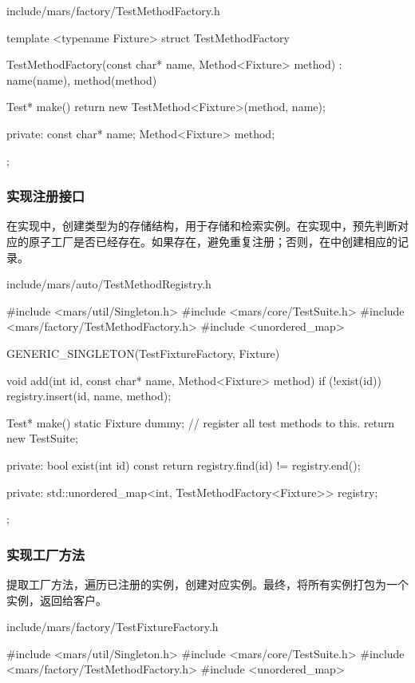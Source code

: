\begin{content}
\begin{nodiff}{include/mars/factory/TestMethodFactory.h}
\begin{c++}
template <typename Fixture>
struct TestMethodFactory {
  TestMethodFactory(const char* name, Method<Fixture> method)
    : name(name), method(method) {}

  Test* make() {
    return new TestMethod<Fixture>(method, name);
  }

private:
  const char* name;
  Method<Fixture> method;
};
 \end{c++}
\end{nodiff}

\subsubsection{实现注册接口}

在实现中，创建类型为的存储结构，用于存储和检索实例。在实现中，预先判断对应的原子工厂是否已经存在。如果存在，避免重复注册；否则，在中创建相应的记录。

\begin{nodiff}{include/mars/auto/TestMethodRegistry.h}
 \begin{c++}
#include <mars/util/Singleton.h>
#include <mars/core/TestSuite.h>
#include <mars/factory/TestMethodFactory.h>
#include <unordered_map>

GENERIC_SINGLETON(TestFixtureFactory, Fixture) {
  void add(int id, const char* name, Method<Fixture> method) {
    if (!exist(id)) {
      registry.insert({id, {name, method}});
    }
  }

  Test* make() {
    static Fixture dummy; // register all test methods to this.
    return new TestSuite;
  }

private:
  bool exist(int id) const {
    return registry.find(id) != registry.end();
  }

private:
  std::unordered_map<int, TestMethodFactory<Fixture>> registry;
};
 \end{c++}
\end{nodiff}

\subsubsection{实现工厂方法}

提取工厂方法，遍历已注册的实例，创建对应实例。最终，将所有实例打包为一个实例，返回给客户。

\begin{nodiff}{include/mars/factory/TestFixtureFactory.h}
 \begin{c++}
#include <mars/util/Singleton.h>
#include <mars/core/TestSuite.h>
#include <mars/factory/TestMethodFactory.h>
#include <unordered_map>


\end{c++}
\end{nodiff}
\end{content}
